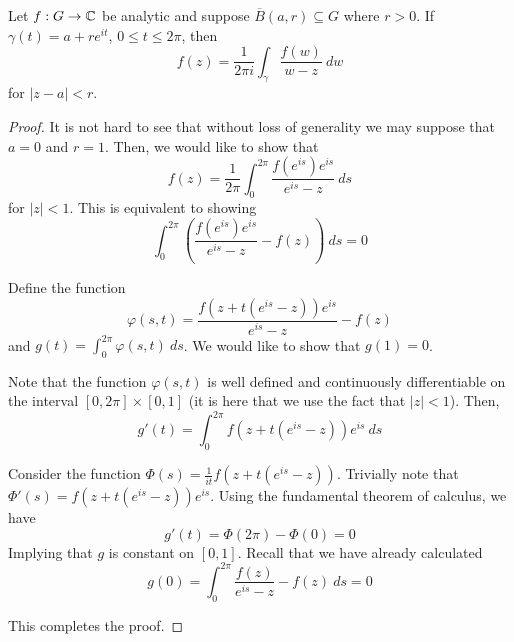 \begin{proposition}
    Let $f: G\to\mathbb{C}$ be analytic and suppose $\overline B(a,r)\subseteq G$ where $r > 0$. If $\gamma(t) = a + re^{it}$, $0\le t\le 2\pi$, then 
    \begin{equation*}
        f(z) = \frac{1}{2\pi i}\int_\gamma\frac{f(w)}{w - z}~dw
    \end{equation*}
    for $|z - a| < r$.
\end{proposition}
\begin{proof}
    It is not hard to see that without loss of generality we may suppose that $a = 0$ and $r = 1$. Then, we would like to show that 
    \begin{equation*}
        f(z) = \frac{1}{2\pi}\int_0^{2\pi}\frac{f(e^{is})e^{is}}{e^{is} - z}~ds
    \end{equation*}
    for $|z| < 1$. This is equivalent to showing 
    \begin{equation*}
        \int_0^{2\pi}\left(\frac{f(e^{is})e^{is}}{e^{is} - z} - f(z)\right)~ds = 0
    \end{equation*}

    Define the function 
    \begin{equation*}
        \varphi(s,t) = \frac{f(z + t(e^{is} - z))e^{is}}{e^{is} - z} - f(z)
    \end{equation*}
    and $g(t) = \int_0^{2\pi}\varphi(s,t)~ds$. We would like to show that $g(1) = 0$.

    Note that the function $\varphi(s,t)$ is well defined and continuously differentiable on the interval $[0,2\pi]\times[0,1]$ (it is here that we use the fact that $|z| < 1$). Then, 
    \begin{equation*}
        g'(t) = \int_0^{2\pi}f(z + t(e^{is} - z))e^{is}~ds
    \end{equation*}

    Consider the function $\Phi(s) = \frac{1}{it}f(z + t(e^{is} - z))$. Trivially note that $\Phi'(s) = f(z + t(e^{is} - z))e^{is}$. Using the fundamental theorem of calculus, we have 
    \begin{equation*}
        g'(t) = \Phi(2\pi) - \Phi(0) = 0
    \end{equation*}
    Implying that $g$ is constant on $[0,1]$. Recall that we have already calculated 
    \begin{equation*}
        g(0) = \int_0^{2\pi}\frac{f(z)}{e^{is} - z} - f(z)~ds = 0
    \end{equation*}

    This completes the proof.
\end{proof}

